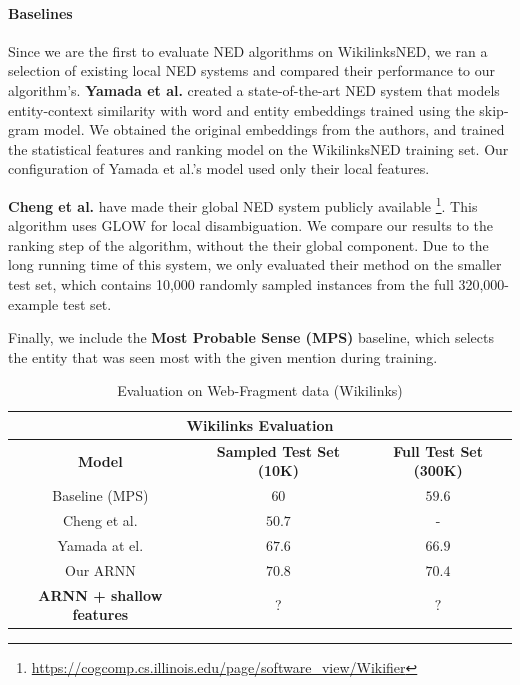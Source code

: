 \documentclass[11pt]{article}
\begin{document}
\paragraph{Baselines}
Since we are the first to evaluate NED algorithms on WikilinksNED, we ran a selection of existing local NED systems and compared their performance to our algorithm's. \textbf{Yamada et al.}  created a state-of-the-art NED system that models entity-context similarity with word and entity embeddings trained using the skip-gram model. We obtained the original embeddings from the authors, and trained the statistical features and ranking model on the WikilinksNED training set. Our configuration of Yamada et al.'s model used only their local features.

\textbf{Cheng et al.}  have made their global NED system publicly available \footnote{\url{https://cogcomp.cs.illinois.edu/page/software\_view/Wikifier}}. This algorithm uses GLOW \cite{Ratinov2011} for local disambiguation. We compare our results to the ranking step of the algorithm, without the their global component. Due to the long running time of this system, we only evaluated their method on the smaller test set, which contains 10,000 randomly sampled instances from the full 320,000-example test set.

Finally, we include the \textbf{Most Probable Sense (MPS)} baseline, which selects the entity that was seen most with the given mention during training.

\begin{table}[t]
	\begin{center}
		\begin{tabular}{|c| c | c | }
			\hline \multicolumn{3}{|c|}{Wikilinks Evaluation} \\
			\hline \bf Model               & \bf Sampled Test Set (10K)  & \bf Full Test Set (300K)  \\
			Baseline (MPS)                 & $60$   & $59.6$ \\
			Cheng et al.                   & $50.7$ & - \\
			Yamada at el.                  & $67.6$ & $66.9$ \\
			\hline
			Our ARNN                       & $70.8$ & $70.4$ \\
			\bf ARNN + shallow features    & ?      &  $?$ \\
			\hline
		\end{tabular}
	\end{center}
	\caption{\label{tab:wikilink} Evaluation on Web-Fragment data (Wikilinks)}
\end{table}
\end{document}
